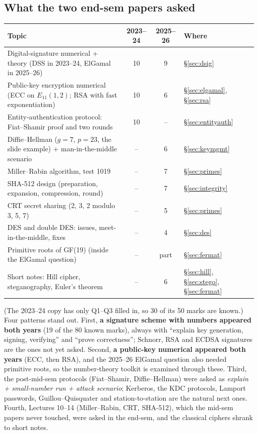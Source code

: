 \subsection{What the two end-sem papers asked}
\begin{center}\small
\begin{tabularx}{\textwidth}{@{}X c c l@{}}
\toprule
Topic & 2023--24 & 2025--26 & Where\\
\midrule
Digital-signature numerical + theory (DSS in 2023--24, ElGamal in 2025--26) & 10 & 9 & \S\ref{sec:dsig}\\
Public-key encryption numerical (ECC on $E_{11}(1, 2)$; RSA with fast exponentiation) & 10 & 6 & \S\ref{sec:elgamal}, \S\ref{sec:rsa}\\
Entity-authentication protocol: Fiat--Shamir proof and two rounds & 10 & -- & \S\ref{sec:entityauth}\\
Diffie--Hellman ($g = 7$, $p = 23$, the slide example) + man-in-the-middle scenario & -- & 6 & \S\ref{sec:keymgmt}\\
Miller--Rabin algorithm, test 1019 & -- & 7 & \S\ref{sec:primes}\\
SHA-512 design (preparation, expansion, compression, round) & -- & 7 & \S\ref{sec:integrity}\\
CRT secret sharing (2, 3, 2 modulo 3, 5, 7) & -- & 5 & \S\ref{sec:primes}\\
DES and double DES: issues, meet-in-the-middle, fixes & -- & 4 & \S\ref{sec:des}\\
Primitive roots of GF(19) (inside the ElGamal question) & -- & part & \S\ref{sec:fermat}\\
Short notes: Hill cipher, steganography, Euler's theorem & -- & 6 & \S\ref{sec:hill}, \S\ref{sec:stego}, \S\ref{sec:fermat}\\
\bottomrule
\end{tabularx}
\end{center}
(The 2023--24 copy has only Q1--Q3 filled in, so 30 of its 50 marks are known.) Four patterns stand out. First, \textbf{a signature scheme with numbers appeared both years} (19 of the 80 known marks), always with ``explain key generation, signing, verifying'' and ``prove correctness''; Schnorr, RSA and ECDSA signatures are the ones not yet asked. Second, \textbf{a public-key numerical appeared both years} (ECC, then RSA), and the 2025--26 ElGamal question also needed primitive roots, so the number-theory toolkit is examined through these. Third, the post-mid-sem protocols (Fiat--Shamir, Diffie--Hellman) were asked as \emph{explain + small-number run + attack scenario}; Kerberos, the KDC protocols, Lamport passwords, Guillou--Quisquater and station-to-station are the natural next ones. Fourth, Lectures 10--14 (Miller--Rabin, CRT, SHA-512), which the mid-sem papers never touched, were asked in the end-sem, and the classical ciphers shrank to short notes.

